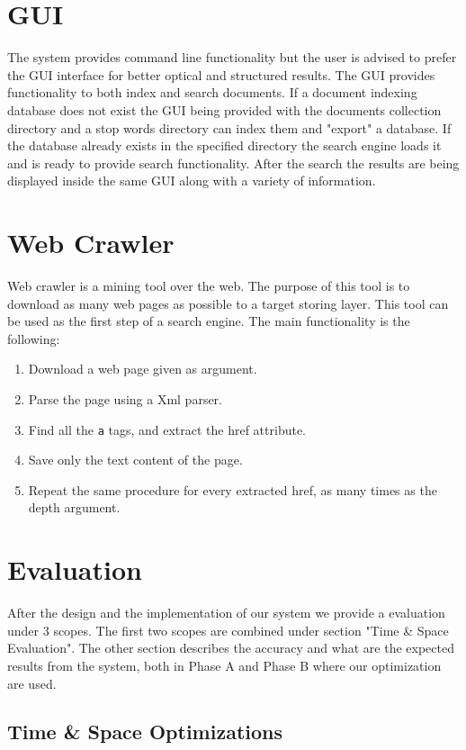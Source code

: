 \documentclass[letterpaper,10pt]{article}
\begin{document}
\section{GUI}
The system provides command line functionality but the user is advised to prefer the GUI interface for better optical and structured results. The GUI provides functionality to both index and search documents. If a document indexing database does not exist the GUI being provided with the documents collection directory and a stop words directory can index them and "export" a database. If the database already exists in the specified directory the search engine loads it and is ready to provide search functionality. After the search the results are being displayed inside the same GUI along with a variety of information.

\section{Web Crawler}
Web crawler is a mining tool over the web. The purpose of this tool is to download as many web pages as possible to a target storing layer. This tool can be used as the first step of a search engine. The main functionality is the following:
\begin{enumerate}
  \item Download a web page given as argument.
  \item Parse the page using a Xml parser.
  \item Find all the {\tt a} tags, and extract the href attribute.
  \item Save only the text content of the page.
  \item Repeat the same procedure for every extracted href, as many times as the depth argument.
\end{enumerate}

\section{Evaluation}

After the design and the implementation of our system we provide a evaluation
under 3 scopes. The first two scopes are combined under section "Time \& Space
Evaluation". The other section describes the accuracy and what are the expected
results from the system, both in Phase A and Phase B where our optimization are
used.

\subsection{ Time \& Space Optimizations }
\end{document}
